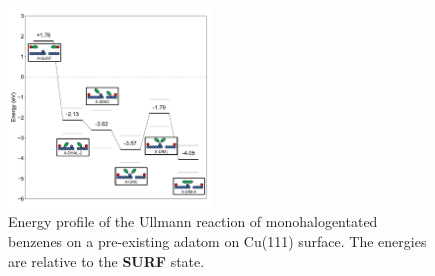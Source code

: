 \documentclass[%
 reprint,
 amsmath,amssymb,
 aps,
prb,
floatfix,
]{revtex4-2}
\newcommand{\comm}{\color{ForestGreen}} %
\begin{document}
\begin{figure}[hbt]
\centering
\includegraphics[width=0.48\textwidth]{Fig/ullmann_adatom.pdf}
\caption{Energy profile of the Ullmann reaction of monohalogentated benzenes on a pre-existing adatom on Cu(111) surface. The energies are relative to the \textbf{SURF} state. 
} 
\label{fig:adatomullmann}
\end{figure}


\ifdefined\INTERNAL
\end{document}
